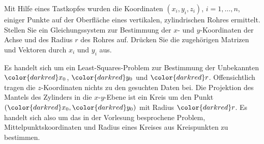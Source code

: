Mit Hilfe eines Tastkopfes wurden die Koordinaten $(x_i,y_i,z_i)$,
$i=1,\dots,n$, einiger Punkte auf der Oberfläche eines vertikalen,
zylindrischen Rohres ermittelt.
Stellen Sie ein Gleichungssystem zur Bestimmung der $x$- und $y$-Koordinaten
der Achse und des Radius $r$ des Rohres auf.
Drücken Sie die zugehörigen Matrizen und Vektoren durch $x_i$ und $y_i$ aus.


\begin{loesung}
Es handelt sich um ein Least-Squares-Problem zur Bestimmung der
Unbekannten ${\color{darkred}x_0}$, ${\color{darkred}y_0}$
und ${\color{darkred}r}$.
Offensichtlich tragen die $z$-Koordinaten nichts zu den gesuchten
Daten bei.
Die Projektion des Mantels des Zylinders in die $x$-$y$-Ebene ist
ein Kreis um den Punkt $({\color{darkred}x_0},{\color{darkred}y_0})$
mit Radius ${\color{darkred}r}$.
Es handelt sich also um das in der Vorlesung besprochene Problem,
Mittelpunktskoordinaten und Radius eines Kreises aus Kreispunkten
zu bestimmen.


\end{loesung}
